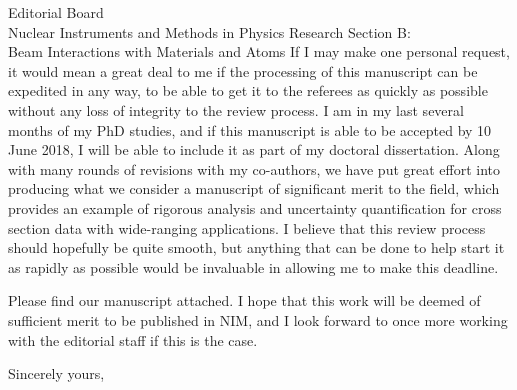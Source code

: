 \documentclass{letter} %
\begin{document}
\begin{letter}{Editorial Board \\
Nuclear Instruments and Methods in Physics Research Section B: \\
Beam Interactions with Materials and Atoms}
If I may make one personal request, it would mean a great deal to me if the processing of this manuscript can be expedited in any way, to be able to get it to the referees as quickly as possible without any loss of integrity to the review process. 
I am in my last several months of my PhD studies, and if this manuscript is able to be accepted by 10 June 2018, I will be able to include it as part of my doctoral dissertation.
Along with many rounds of revisions with my co-authors, we have put great effort into producing what we consider a manuscript of significant merit to the field, which provides an example of rigorous analysis and uncertainty quantification for cross section data with wide-ranging applications.  
I believe that this review process should hopefully be quite smooth, but anything that can be done to help start it as rapidly as possible would be invaluable in allowing me to make this deadline.


Please find our manuscript attached. I hope that this work will be deemed of sufficient merit to be published in NIM, and I look forward to once more working with the editorial staff if this is the case. 
 
\closing{Sincerely yours,} 
 

 

\end{letter}
 
\end{document}
